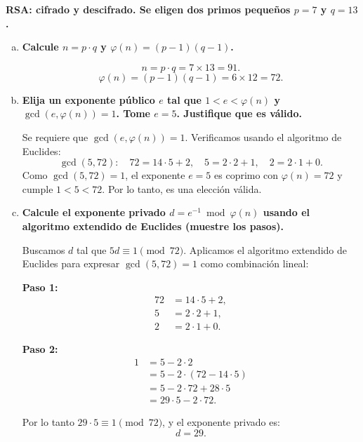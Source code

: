 {\bfseries RSA: cifrado y descifrado. Se eligen dos primos pequeños $p = 7$ y $q = 13$.}

\begin{enumerate}[a)]
	\item {\bfseries Calcule $n = p \cdot q$ y $\varphi(n) = (p-1)(q-1)$.}

	      \[
		      n = p \cdot q = 7 \times 13 = 91.
	      \]
	      \[
		      \varphi(n) = (p-1)(q-1) = 6 \times 12 = 72.
	      \]

	\item {\bfseries Elija un exponente público $e$ tal que $1 < e < \varphi(n)$ y $\gcd(e, \varphi(n)) = 1$. Tome $e = 5$. Justifique que es válido.}

	      Se requiere que $\gcd(e, \varphi(n)) = 1$. Verificamos usando el algoritmo de Euclides:
	      \[
		      \gcd(5, 72): \quad 72 = 14 \cdot 5 + 2, \quad 5 = 2 \cdot 2 + 1, \quad 2 = 2 \cdot 1 + 0.
	      \]
	      Como $\gcd(5, 72) = 1$, el exponente $e = 5$ es coprimo con $\varphi(n) = 72$ y cumple $1 < 5 < 72$. Por lo tanto, es una elección válida.

	      \vspace{3mm}

	\item {\bfseries Calcule el exponente privado $d = e^{-1} \bmod \varphi(n)$ usando el algoritmo extendido de Euclides (muestre los pasos).}

	      Buscamos $d$ tal que $5d \equiv 1 \pmod{72}$. Aplicamos el algoritmo extendido de Euclides para expresar $\gcd(5, 72) = 1$ como combinación lineal:

	      \textbf{Paso 1:}
	      \begin{align*}
		      72 & = 14 \cdot 5 + 2, \\
		      5  & = 2 \cdot 2 + 1,  \\
		      2  & = 2 \cdot 1 + 0.
	      \end{align*}

	      \textbf{Paso 2:}
	      \begin{align*}
		      1 & = 5 - 2 \cdot 2                 \\
		        & = 5 - 2 \cdot (72 - 14 \cdot 5) \\
		        & = 5 - 2 \cdot 72 + 28 \cdot 5   \\
		        & = 29 \cdot 5 - 2 \cdot 72.
	      \end{align*}

	      Por lo tanto $29 \cdot 5 \equiv 1 \pmod{72}$, y el exponente privado es:
	      \[
		      \boxed{d = 29.}
	      \]


\end{enumerate}
